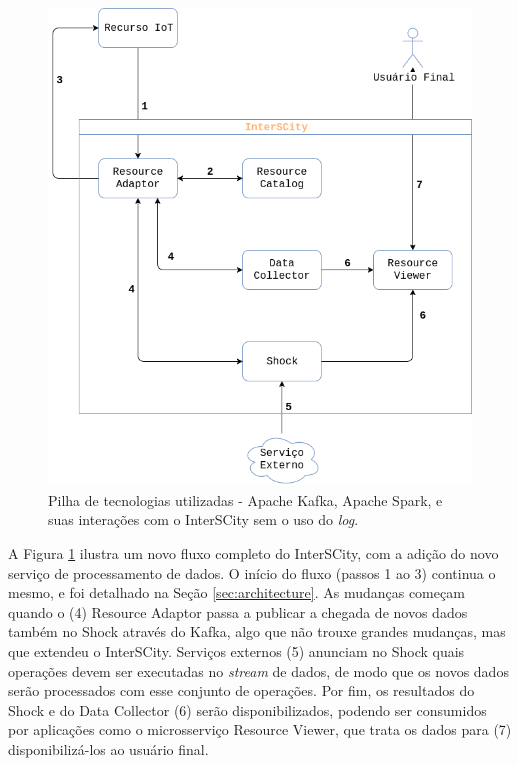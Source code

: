 \begin{figure}
  \centering
    \includegraphics[scale=0.45]{figuras/shock_usage.png}
  \caption{Pilha de tecnologias utilizadas - Apache Kafka, Apache Spark, e suas
    interações com o InterSCity sem o uso do \textit{log}.}
  \label{fig:shock_usage}
\end{figure}

A Figura \ref{fig:shock_usage} ilustra um novo fluxo completo do InterSCity,
com a adição do novo serviço de processamento de dados. O início do fluxo
(passos 1 ao 3) continua o mesmo, e foi detalhado na Seção
\ref{sec:architecture}. As mudanças começam quando o (4) Resource Adaptor passa
a publicar a chegada de novos dados também no Shock através do Kafka, algo que
não trouxe grandes mudanças, mas que extendeu o InterSCity. Serviços externos
(5) anunciam no Shock quais operações devem ser executadas no \textit{stream}
de dados, de modo que os novos dados serão processados com esse conjunto de
operações. Por fim, os resultados do Shock e do Data Collector (6) serão
disponibilizados, podendo ser consumidos por aplicações como o microsserviço
Resource Viewer, que trata os dados para (7) disponibilizá-los ao usuário final.

